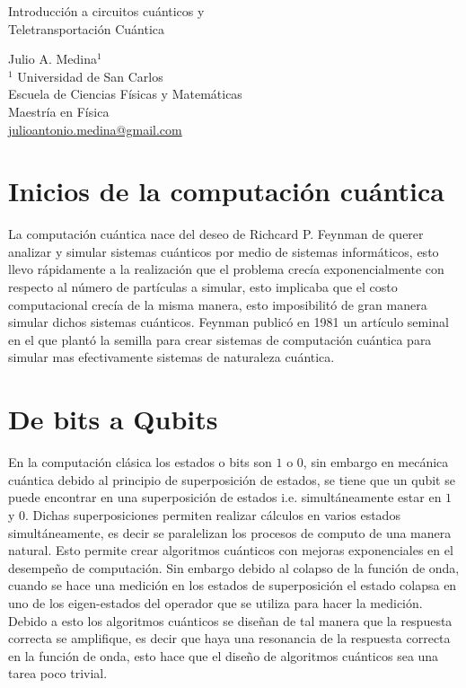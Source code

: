 \documentclass[a4paper]{article}
\begin{document}

\Large
 \begin{center}
Introducción a circuitos cuánticos y\\
Teletransportación Cuántica  

\hspace{10pt}

\large
Julio A. Medina$^1$ \\
\hspace{10pt}
\small  
$^1$ Universidad de San Carlos\\
Escuela de Ciencias Físicas y Matemáticas\\
Maestría en Física\\
\href{mailto:julioantonio.medina@gmail.com}{julioantonio.medina@gmail.com}\\

\end{center}

\hspace{10pt}

\normalsize
\section{Inicios de la computación cuántica}
 La computación cuántica nace del deseo de Richcard P. Feynman de querer analizar y simular sistemas cuánticos por medio de sistemas informáticos, esto llevo rápidamente a la realización que el problema crecía exponencialmente con respecto al número de partículas a simular, esto implicaba que el costo computacional crecía de la misma manera, esto imposibilitó de gran manera simular dichos sistemas cuánticos. Feynman\cite{Feynman} publicó en 1981 un artículo seminal en el que plantó la semilla para crear sistemas de computación cuántica para simular mas efectivamente sistemas de naturaleza cuántica. \\
 
\section{De bits a Qubits}
En la computación clásica los estados o bits son $1$ o $0$, sin embargo en mecánica cuántica debido al principio de superposición de estados, se tiene que un qubit se puede encontrar en una superposición de estados i.e. simultáneamente estar en $1$ y $0$. Dichas superposiciones permiten realizar cálculos en varios estados simultáneamente, es decir se paralelizan los procesos de computo de una manera natural. Esto permite crear algoritmos cuánticos con mejoras exponenciales en el desempeño de computación. Sin embargo debido al colapso de la función de onda, cuando se hace una medición en los estados de superposición el estado colapsa en uno de los eigen-estados del operador que se utiliza para hacer la medición. \\
Debido a esto los algoritmos cuánticos se diseñan de tal manera que la respuesta correcta se amplifique, es decir que haya una resonancia de la respuesta correcta en la función de onda, esto hace que el diseño de algoritmos cuánticos sea una tarea poco trivial.
\end{document}
